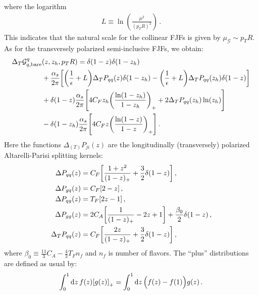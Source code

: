 \documentclass[a4paper, 11 pt]{article}
\begin{document}
where the logarithm 
\begin{align}
    L \equiv \ln(\frac{\mu ^2}{\left(p_TR\right)^2})\,.
\end{align}
This indicates that the natural scale for the collinear FJFs is given by $\mu_{\mathscr{G}}\sim p_TR$. As for the transversely polarized semi-inclusive FJFs, we obtain:
\begin{align}
\Delta _T \mathcal{G}^q_{q, \mathrm{bare}} & (z, z_h, p_TR)
= 
\delta (1-z) \delta(1-z_h)
\nonumber \\
& +
\frac{\alpha _s}{2 \pi} \bqty{\pqty{\frac{1}{\epsilon} + L} \Delta _T P_{qq} (z) \delta (1-z_h) - \pqty{\frac{1}{\epsilon} + L} \Delta _T P_{qq} (z_h) \delta (1-z)}
\nonumber \\
& +
\delta (1-z) \frac{\alpha _s}{2 \pi} \bqty{4 C_F z_h \pqty{\frac{\ln(1-z_h)}{1-z_h}}_+ + 2 \Delta _T P_{qq} (z_h) \ln(z_h)}
\nonumber \\
& -
\delta (1-z_h) \frac{\alpha _s}{2 \pi} \bqty{4 C_F z \pqty{\frac{\ln(1-z)}{1-z}}_+}
\, . \label{e.bare_collinear_G_qq_T}
\end{align}
Here the functions $\Delta_{(T)} P_{ji}(z)$ are the longitudinally (transversely) polarized Altarelli-Parisi splitting kernels:
\begin{align}
\Delta P_{qq}(z)
& =
C_F \bqty{\frac{1+z^2}{(1-z)_+} + \frac{3}{2} \delta (1-z)}
\, , \label{e.AP_longitudinal_qq} \\
\Delta P_{gq}(z)
& =
C_F \bqty{2 - z}
\, , \label{e.AP_longitudinal_gq} \\
\Delta P_{qg}(z)
& =
T_F \bqty{2z-1}
\, , \label{e.AP_longitudinal_qg} \\
\Delta P_{gg}(z)
& =
2 C_A \bqty{\frac{1}{(1-z)_+} - 2z + 1}
+
\frac{\beta _0}{2} \delta (1-z)
\, , \label{e.AP_longitudinal_gg} \\
\Delta _T P_{qq}(z)
& =
C_F \bqty{\frac{2z}{(1-z)_+} + \frac{3}{2} \delta (1-z)}
\, , \label{e.AP_transverse_qq}
\end{align}
where $\beta _0 \equiv \frac{11}{3} C_A - \frac{4}{3} T_F n_f$ and $n_f$ is number of flavors.
The ``plus'' distributions are defined as usual by:
\begin{equation}
\int _0^1 \dd{z} f \pqty{z} \bqty{g \pqty{z}}_+
=
\int _0^1 \dd{z} \Big(f \pqty{z} - f \pqty{1} \Big) g \pqty{z}
\, .
\end{equation}
\end{document}
